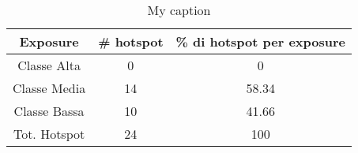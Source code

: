 \begin{table}[H]
	\centering
	\caption{My caption}
	\label{risultati_roma_pescara}
	\begin{tabular}{|c|c|c|}
		\hline
		\rowcolor[HTML]{C0C0C0} 
		\textbf{Exposure} & \textbf{\# hotspot} & \textbf{\% di hotspot per exposure} \\ \hline
		Classe Alta       & 0                  & 0                                   \\ \hline
		Classe Media      & 14                  & 58.34                            \\ \hline
		Classe Bassa      & 10                & 41.66                               \\ \hline
		Tot. Hotspot      & 24               & 100                                 \\ \hline
	\end{tabular}
\end{table}


